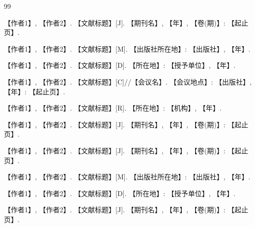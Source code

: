 
%
%

\begin{thebibliography}{99}

 【作者1】, 【作者2】. 【文献标题】[J]. 【期刊名】, 【年】, 【卷(期)】: 【起止页】.

 【作者1】, 【作者2】. 【文献标题】[M]. 【出版社所在地】: 【出版社】, 【年】.

 【作者1】, 【作者2】. 【文献标题】[D]. 【所在地】: 【授予单位】, 【年】.

 【作者1】, 【作者2】. 【文献标题】[C]//【会议名】. 【会议地点】: 【出版社】, 【年】: 【起止页】.

 【作者1】, 【作者2】. 【文献标题】[R]. 【所在地】: 【机构】, 【年】.

 【作者1】, 【作者2】. 【文献标题】[J]. 【期刊名】, 【年】, 【卷(期)】: 【起止页】.

 【作者1】, 【作者2】. 【文献标题】[J]. 【期刊名】, 【年】, 【卷(期)】: 【起止页】.

 【作者1】, 【作者2】. 【文献标题】[M]. 【出版社所在地】: 【出版社】, 【年】.

 【作者1】, 【作者2】. 【文献标题】[D]. 【所在地】: 【授予单位】, 【年】.

 【作者1】, 【作者2】. 【文献标题】[J]. 【期刊名】, 【年】, 【卷(期)】: 【起止页】.

\end{thebibliography}

